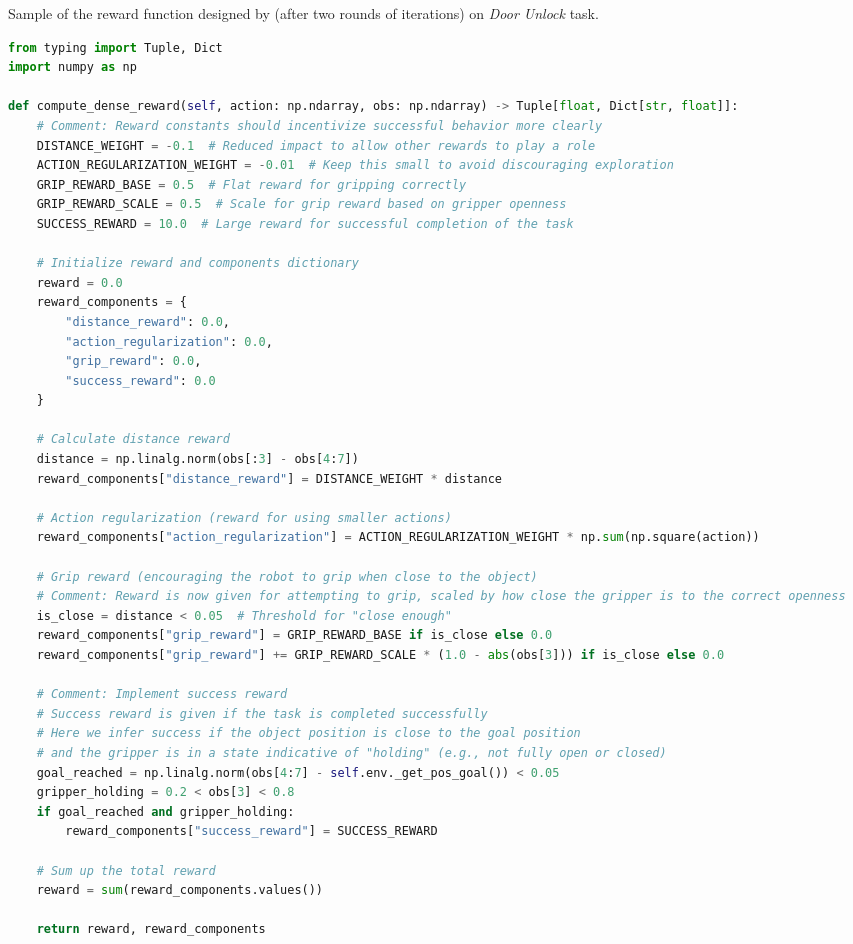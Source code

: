 \documentclass{article}
\theoremstyle{plain}
\theoremstyle{definition}
\theoremstyle{remark}
\begin{document}
\begin{table}[!ht]
\centering
\caption{Sample of the reward function designed by \ourmethod (after two rounds of iterations) on \MW \textit{Door Unlock} task.}
\begin{tcolorbox}
\begin{lstlisting}[language=python,breaklines]
from typing import Tuple, Dict
import numpy as np

def compute_dense_reward(self, action: np.ndarray, obs: np.ndarray) -> Tuple[float, Dict[str, float]]:
    # Comment: Reward constants should incentivize successful behavior more clearly
    DISTANCE_WEIGHT = -0.1  # Reduced impact to allow other rewards to play a role
    ACTION_REGULARIZATION_WEIGHT = -0.01  # Keep this small to avoid discouraging exploration
    GRIP_REWARD_BASE = 0.5  # Flat reward for gripping correctly
    GRIP_REWARD_SCALE = 0.5  # Scale for grip reward based on gripper openness
    SUCCESS_REWARD = 10.0  # Large reward for successful completion of the task

    # Initialize reward and components dictionary
    reward = 0.0
    reward_components = {
        "distance_reward": 0.0,
        "action_regularization": 0.0,
        "grip_reward": 0.0,
        "success_reward": 0.0
    }

    # Calculate distance reward
    distance = np.linalg.norm(obs[:3] - obs[4:7])
    reward_components["distance_reward"] = DISTANCE_WEIGHT * distance
    
    # Action regularization (reward for using smaller actions)
    reward_components["action_regularization"] = ACTION_REGULARIZATION_WEIGHT * np.sum(np.square(action))
    
    # Grip reward (encouraging the robot to grip when close to the object)
    # Comment: Reward is now given for attempting to grip, scaled by how close the gripper is to the correct openness
    is_close = distance < 0.05  # Threshold for "close enough"
    reward_components["grip_reward"] = GRIP_REWARD_BASE if is_close else 0.0
    reward_components["grip_reward"] += GRIP_REWARD_SCALE * (1.0 - abs(obs[3])) if is_close else 0.0

    # Comment: Implement success reward
    # Success reward is given if the task is completed successfully
    # Here we infer success if the object position is close to the goal position
    # and the gripper is in a state indicative of "holding" (e.g., not fully open or closed)
    goal_reached = np.linalg.norm(obs[4:7] - self.env._get_pos_goal()) < 0.05
    gripper_holding = 0.2 < obs[3] < 0.8
    if goal_reached and gripper_holding:
        reward_components["success_reward"] = SUCCESS_REWARD

    # Sum up the total reward
    reward = sum(reward_components.values())
    
    return reward, reward_components
\end{lstlisting}
\end{tcolorbox}
\label{tab:ourmethod_code_doorunlock}
\end{table}
\end{document}
